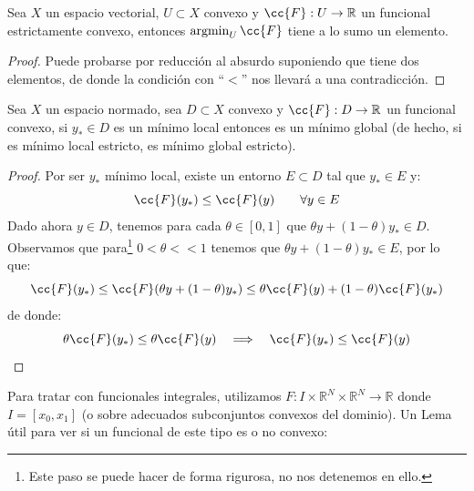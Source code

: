 \begin{coro}
    Sea $X$ un espacio vectorial, $U\subset X$ convexo y $\cc{F}:U\to \mathbb{R}$ un funcional estrictamente convexo, entonces $\argmin_U\cc{F}$ tiene a lo sumo un elemento.
    \begin{proof}
        Puede probarse por reducción al absurdo suponiendo que tiene dos elementos, de donde la condición con ``$<$'' nos llevará a una contradicción.
    \end{proof}
\end{coro}

\begin{prop}
    Sea $X$ un espacio normado, sea $D\subset X$ convexo y $\cc{F}:D\to \mathbb{R}$ un funcional convexo, si $y_\ast\in D$ es un mínimo local entonces es un mínimo global (de hecho, si es mínimo local estricto, es mínimo global estricto).
    \begin{proof}
        Por ser $y_\ast$ mínimo local, existe un entorno $E\subset D$ tal que $y_\ast\in E$ y:
        \begin{equation*}
            \cc{F}(y_\ast) \leq \cc{F}(y) \qquad \forall y\in E
        \end{equation*}
        Dado ahora $y\in D$, tenemos para cada $\theta \in [0,1]$ que $\theta y + (1-\theta)y_\ast \in D$. Observamos que para\footnote{Este paso se puede hacer de forma rigurosa, no nos detenemos en ello.} $0<\theta <<1$ tenemos que $\theta y + (1-\theta)y_\ast\in E$, por lo que:
        \begin{equation*}
            \cc{F}(y_\ast) \leq \cc{F}(\theta y + (1-\theta)y_\ast) \leq \theta \cc{F}(y) + (1-\theta)\cc{F}(y_\ast)
        \end{equation*}
        de donde:
        \begin{equation*}
            \theta\cc{F}(y_\ast) \leq \theta \cc{F}(y) \quad\Longrightarrow\quad \cc{F}(y_\ast) \leq \cc{F}(y)
        \end{equation*}
    \end{proof}
\end{prop}

\noindent
Para tratar con funcionales integrales, utilizamos $F:I\times\mathbb{R}^N\times\mathbb{R}^N\to \mathbb{R}$ donde $I = [x_0,x_1]$ (o sobre adecuados subconjuntos convexos del dominio). Un Lema útil para ver si un funcional de este tipo es o no convexo:

